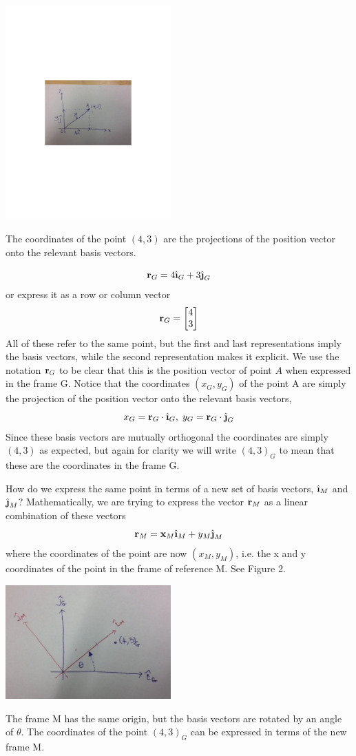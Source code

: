 \documentclass[M3_Night6_Solutions]{subfiles}
\begin{document}
\begin{marginfigure}
\includegraphics[width=2.5in]{figs/globalframe.pdf}
\caption{The coordinates of the point $(4,3)$ are the projections of the position vector onto the relevant basis vectors.}
\label{fig:globalframe}
\end{marginfigure}

\[\r_G = 4 \ihat_G + 3 \jhat_G \]
or express it as a row or column vector
\[\mathbf{r}_G = \begin{bmatrix} 4 \\ 3 \end{bmatrix} \]
All of these refer to the same point, but the first and last representations imply the basis vectors, while the second representation makes it explicit. We use the notation $\mathbf{r}_G$ to be clear that this is the position vector of point $A$ when expressed in the frame G. Notice that the coordinates $(x_G,y_G)$ of the point A are simply the projection of the position vector onto the relevant basis vectors,
\[x_G = \r_G \cdot \ihat_G, \; y_G = \r_G \cdot \jhat_G \]
Since these basis vectors are mutually orthogonal the coordinates are simply $(4,3)$ as expected, but again for clarity we will write $(4,3)_G$ to mean that these are the coordinates in the frame G.

How do we express the same point in terms of a new set of basis vectors, $\ihat_M$ and $\jhat_M$?  Mathematically, we are trying to express the vector $\mathbf{r}_M$ as a linear combination of these vectors
\[ \r_M = \x_M \ihat_M + y_M \jhat_M \]
where the coordinates of the point are now $(x_M,y_M)$, i.e. the x and y coordinates of the point in the frame of reference M. See Figure 2.

\begin{marginfigure}
\includegraphics[width=2.5in]{figs/newframe}
\caption{The frame M has the same origin, but the basis vectors are rotated by an angle of $\theta$. The coordinates of the point $(4,3)_G$ can be expressed in terms of the new frame M.}
\label{fig:globalframe}
\end{marginfigure}
\end{document}
